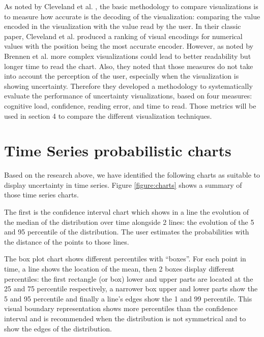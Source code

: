 \documentclass[a4paper,3p,sort&compress]{elsarticle}
\begin{document}
As noted by Cleveland et al. \cite{cleveland_graphical_1984}, the basic methodology to compare visualizations is to measure how accurate is the 
decoding of the visualization: comparing the value encoded in the visualization with the value read
by the user. In their classic paper, Cleveland et al. \cite{cleveland_graphical_1984} produced a ranking of visual encodings for numerical values 
with the position being the most accurate encoder. However, as noted by Brennen et al. \cite{brennen_instrument_2018}
more complex visualizations could lead to better readability but longer time to read the chart. Also, 
they noted that those measures do not take into account the perception of the user, especially when the visualization
is showing uncertainty. Therefore they developed a methodology 
to systematically evaluate the performance of uncertainty visualizations, based on four measures: 
cognitive load, confidence, reading error, and time to read. Those metrics will be used in section 4 to compare the different 
visualization techniques.

\section{Time Series probabilistic charts}  
\label{sec:time_series}

Based on the research above, we have identified the following charts as suitable to display 
uncertainty in time series. Figure \ref{figure:charts} shows a summary of those time series charts.

The first is the confidence interval chart which shows in a line the evolution of the 
median of the distribution
 over time alongside 2 lines: the evolution of the 5 and 95 percentile of the distribution. 
 The user estimates the probabilities with the distance of the points to those lines.

The box plot chart shows different percentiles with “boxes”. For each point in time, a 
line shows the location of the mean, then 2 boxes display different percentiles: the
first rectangle (or box) lower and upper parts are located 
at the 25 and 75 percentile respectively, a narrower box upper and lower parts show 
the 5 and 95 percentile and finally a line’s edges show the 1 and 99 percentile. 
This visual boundary representation shows more percentiles than the confidence interval and 
is recommended when the distribution is not symmetrical and to show the edges of the distribution.
\end{document}
